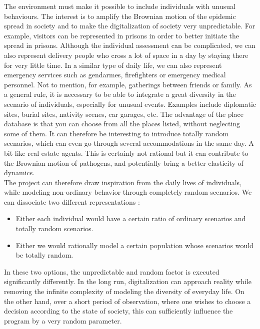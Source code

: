 The environment must make it possible to include individuals with unusual behaviours. The interest is to amplify the Brownian motion of the epidemic spread in society and to make the digitalization of society very unpredictable. For example, visitors can be represented in prisons in order to better initiate the spread in prisons. Although the individual assessment can be complicated, we can also represent delivery people who cross a lot of space in a day by staying there for very little time. In a similar type of daily life, we can also represent emergency services such as gendarmes, firefighters or emergency medical personnel. Not to mention, for example, gatherings between friends or family. As a general rule, it is necessary to be able to integrate a great diversity in the scenario of individuals, especially for unusual events. Examples include diplomatic sites, burial sites, nativity scenes, car garages, etc. The advantage of the place database is that you can choose from all the places listed, without neglecting some of them. It can therefore be interesting to introduce totally random scenarios, which can even go through several accommodations in the same day. A bit like real estate agents. This is certainly not rational but it can contribute to the Brownian motion of pathogens, and potentially bring a better elasticity of dynamics.\\

The project can therefore draw inspiration from the daily lives of individuals, while modeling non-ordinary behavior through completely random scenarios. We can dissociate two different representations :\\

\begin{itemize}
\item Either each individual would have a certain ratio of ordinary scenarios and totally random scenarios.
\item Either we would rationally model a certain population whose scenarios would be totally random.\\
\end{itemize}

In these two options, the unpredictable and random factor is executed significantly differently. In the long run, digitalization can approach reality while removing the infinite complexity of modeling the diversity of everyday life. On the other hand, over a short period of observation, where one wishes to choose a decision according to the state of society, this can sufficiently influence the program by a very random parameter.\\

